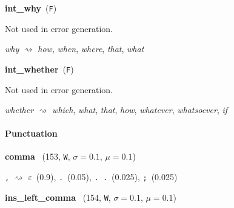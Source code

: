 \documentclass[11pt]{article}
\newenvironment{desc}{%
	\list{}{%
		\parsep 0.25em
		\topsep 0.25em
		\leftmargin 1em
		\rightmargin 0em
	}
	\item\relax
	\sloppy
}{%
	\endlist
}
\newcommand{\attr}[4]{%
	(#1, \texttt{#2}, $\sigma=#3$, $\mu=#4$)
}
\begin{document}
\noindent
\textbf{int\_why}~(\texttt{F})

\begin{desc}
	Not used in error generation.

	\textit{why}
	$\rightsquigarrow$
	\textit{how},
	\textit{when},
	\textit{where},
	\textit{that},
	\textit{what}
\end{desc}

\noindent
\textbf{int\_whether}~(\texttt{F})

\begin{desc}
	Not used in error generation.

	\textit{whether}
	$\rightsquigarrow$
	\textit{which},
	\textit{what},
	\textit{that},
	\textit{how},
	\textit{whatever},
	\textit{whatsoever},
	\textit{if}
\end{desc}

\paragraph{Punctuation}\mbox{}

\noindent
\textbf{comma}~\attr{153}{W}{0.1}{0.1}

\begin{desc}
	\texttt{,}
	$\rightsquigarrow$
	\textit{$\varepsilon$}~(0.9),
	\texttt{.}~(0.05),
	\texttt{.{~}.}~(0.025),
	\texttt{;}~(0.025)
\end{desc}

\noindent
\textbf{ins\_left\_comma}~\attr{154}{W}{0.1}{0.1}
\end{document}

